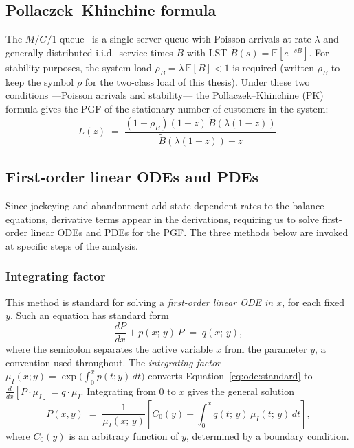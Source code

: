 \subsection{Pollaczek--Khinchine formula}\label{ssec:pk}

The $M/G/1$ queue~\cite{adan2002queueing} is a single-server queue with Poisson arrivals
at rate $\lambda$ and generally distributed i.i.d.\ service times $B$ with LST $\widetilde{B}(s) = \mathbb{E}[e^{-sB}]$.
For stability purposes, the system load $\rho_B = \lambda\,\mathbb{E}[B] < 1$ is required
(written $\rho_B$ to keep the symbol $\rho$ for the two-class load of this thesis).
Under these two conditions ---Poisson arrivals and stability--- the Pollaczek--Khinchine (PK) formula
gives the PGF of the stationary number of customers in the system:
\begin{equation}
    L(z) \;=\; \frac{(1-\rho_B)(1-z)\,\widetilde{B}(\lambda(1-z))}{\widetilde{B}(\lambda(1-z)) - z}.
    \label{eq:pk:pgf}
\end{equation}

\subsection{First-order linear ODEs and PDEs}\label{ssec:ode}

Since jockeying and abandonment add state-dependent rates to the balance equations, derivative terms appear in the derivations, requiring us to solve first-order linear ODEs and PDEs for the PGF. The three methods below are invoked at specific steps of the analysis.

\subsubsection{Integrating factor}\label{sssec:if}

This method is standard for solving a \emph{first-order linear ODE in $x$}, for each fixed $y$. Such an equation has standard form
\begin{equation}
    \frac{dP}{dx} + p(x;\,y)\,P \;=\; q(x;\,y), \label{eq:ode:standard}
\end{equation}
where the semicolon separates the active variable $x$ from the parameter $y$, a convention used throughout.
The \emph{integrating factor} $\mu_I(x;y) = \exp\!\bigl(\int_0^x p(t;y)\,dt\bigr)$ converts Equation~\eqref{eq:ode:standard} to $\frac{d}{dx}[P\cdot\mu_I] = q\cdot\mu_I$. Integrating from $0$ to $x$ gives the general solution
\begin{equation}
    P(x,y) \;=\; \frac{1}{\mu_I(x;\,y)}
        \left[C_0(y) + \int_0^x q(t;\,y)\,\mu_I(t;\,y)\,dt\right],
    \label{eq:ode:general}
\end{equation}
where $C_0(y)$ is an arbitrary function of $y$, determined by a boundary condition.

